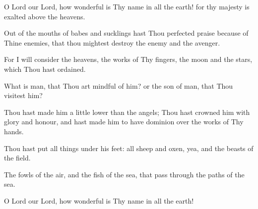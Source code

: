 O Lord our Lord, how wonderful is Thy name in all the earth! for thy majesty is exalted above the heavens.

Out of the mouths of babes and sucklings hast Thou perfected praise because of Thine enemies, that thou mightest destroy the enemy and the avenger.

For I will consider the heavens, the works of Thy fingers, the moon and the stars, which Thou hast ordained.

What is man, that Thou art mindful of him? or the son of man, that Thou visitest him?

Thou hast made him a little lower than the angels; Thou hast crowned him with glory and honour, and hast made him to have dominion over the works of Thy hands.

Thou hast put all things under his feet: all sheep and oxen, yea, and the beasts of the field.

The fowls of the air, and the fish of the sea, that pass through the paths of the sea.

O Lord our Lord, how wonderful is Thy name in all the earth!
